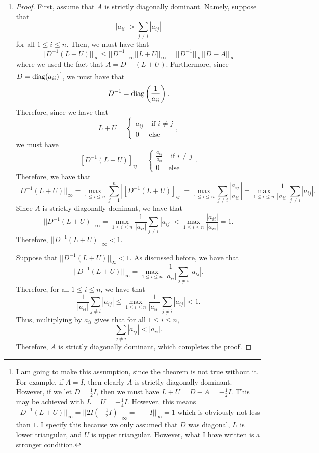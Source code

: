 \documentclass[12pt]{article}
\begin{document}
\begin{enumerate}[leftmargin=0em]
    \item 
    \begin{proof}
        First, assume that $A$ is strictly diagonally dominant. Namely, suppose that
        \[|a_{ii}| > \sum_{j\neq i}|a_{ij}|\]
        for all $1\leq i \leq n$. Then, we must have that
        \[{||D^{-1}(L+U)||}_{\infty} \leq {||D^{-1}||}_{\infty} {||L+U||}_{\infty} =  {||D^{-1}||}_{\infty}{||D-A||}_{\infty}\]
        where we used the fact that $A=D-(L+U)$. Furthermore, since $D=\operatorname{diag}(a_{ii})$\footnote{I am going to make this assumption, since the theorem is not true without it. For example, if $A=I$, then clearly $A$ is strictly diagonally dominant. However, if we let $D=\frac{1}{2}I$, then we must have $L+U= D-A=-\frac{1}{2}I$. This may be achieved with $L=U=-\frac{1}{4}I$. However, this means ${||D^{-1}(L+U)||}_{\infty}= {||2I\left(-\frac{1}{2}I\right)||}_{\infty} = {||-I||}_{\infty} = 1$ which is obviously not less than $1$. I specify this because we only assumed that $D$ was diagonal, $L$ is lower triangular, and $U$ is upper triangular. However, what I have written is a stronger condition.}, we must have that
        \[D^{-1} = \operatorname{diag}\left(\frac{1}{a_{ii}}\right).\]
        Therefore, since we have that
        \[L+U =
        \begin{cases}
            a_{ij} & \text{ if } i\neq j\\
            0 & \text{else}    
        \end{cases},\]
        we must have
        \[{[D^{-1}(L+U)]}_{ij} = 
        \begin{cases}
            \frac{a_{ij}}{a_{ii}} & \text{ if  } i\neq j\\
            0 & \text{else}
        \end{cases}.\]
        Therefore, we have that
        \[{||D^{-1}(L+U)||}_{\infty} = \max_{1\leq i \leq n}\sum_{j=1}^{n}\left|{[D^{-1}(L+U)]}_{ij}\right| = \max_{1\leq i \leq n}\sum_{j\neq i} \left|\frac{a_{ij}}{a_{ii}}\right|= \max_{1\leq i\leq n}\frac{1}{|a_{ii}|}\sum_{j\neq i}|a_{ij}|.\]
        Since $A$ is strictly diagonally dominant, we have that
        \[{||D^{-1}(L+U)||}_{\infty}= \max_{1\leq i\leq n}\frac{1}{|a_{ii}|}\sum_{j\neq i}|a_{ij}| < \max_{1\leq i \leq n}\frac{|a_{ii}|}{|a_{ii}|} = 1.\]
        Therefore, ${||D^{-1}(L+U)||}_{\infty}<1$.

        \bigskip 

        \noindent Suppose that ${||D^{-1}(L+U)||}_{\infty}<1$. As discussed before, we have that
        \[{||D^{-1}(L+U)||}_{\infty}= \max_{1\leq i\leq n}\frac{1}{|a_{ii}|}\sum_{j\neq i}|a_{ij}|.\]
        Therefore, for all $1\leq i \leq n$, we have that
        \[\frac{1}{|a_{ii}|}\sum_{j\neq i}|a_{ij}|\leq \max_{1\leq i\leq n}\frac{1}{|a_{ii}|}\sum_{j\neq i}|a_{ij}|<1.\]
        Thus, multiplying by $a_{ii}$ gives that for all $1\leq i\leq n$,
        \[\sum_{j\neq i}|a_{ij}|<|a_{ii}|.\]
        Therefore, $A$ is strictly diagonally dominant, which completes the proof.
    \end{proof}
\end{enumerate}
\end{document}
